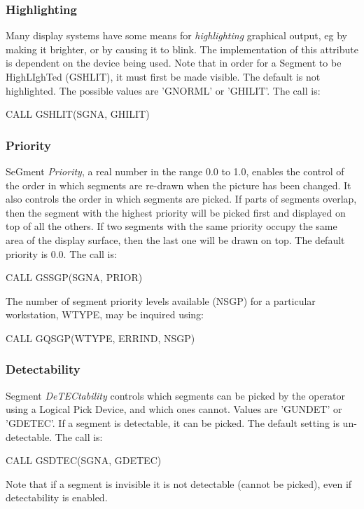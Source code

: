 \subsubsection{Highlighting}
 
Many display systems have some means for {\it highlighting}
graphical output, eg by making it brighter, or by causing it to blink.
The implementation of this attribute is dependent on the device
being used. Note that in order for a Segment to be HighLIghTed (GSHLIT),
it must first be made visible. The default is not highlighted.
The possible values are 'GNORML' or 'GHILIT'. The call is:
\begin{XMP}
CALL GSHLIT(SGNA, GHILIT)
\end{XMP}
\subsubsection{Priority}
 
SeGment {\it Priority}, a real number in the range 0.0 to 1.0,
enables the control of the order in which segments are re-drawn when
the picture has been changed.
It also controls the order in which segments are picked.
If parts of segments overlap, then the segment with the highest
priority will be picked first and displayed on top of all the others.
If two segments with the same priority occupy the same area of the display
surface, then the last one will be drawn on top.
The default priority is 0.0. The call is:
\begin{XMP}
CALL GSSGP(SGNA, PRIOR)
\end{XMP}
 
The number of segment priority levels available (NSGP) for a particular
workstation, WTYPE, may be inquired using:
\begin{XMP}
CALL GQSGP(WTYPE, ERRIND, NSGP)
\end{XMP}
\subsubsection{Detectability}
 
Segment {\it DeTECtability} controls which segments can be
picked by the operator using a Logical Pick Device, and which ones cannot.
Values are 'GUNDET' or 'GDETEC'.
If a segment is detectable, it can be picked.
The default setting is un-detectable. The call is:
\begin{XMP}
CALL GSDTEC(SGNA, GDETEC)
\end{XMP}
Note that if a segment is invisible it is not detectable
(cannot be picked), even if detectability is enabled.

